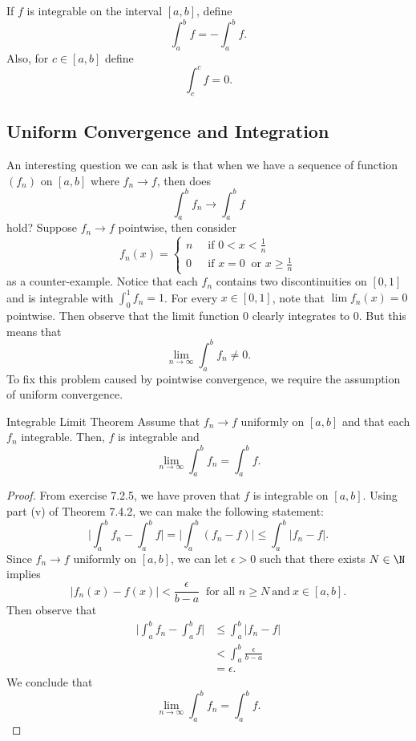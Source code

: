 \begin{definition}{}{}
	If \( f  \) is integrable on the interval \( [a,b]  \), define 
	\[  \int_{ a }^{ b } f = - \int_{ a }^{b  } f. \]
	Also, for \( c \in [a,b]  \) define 
	\[  \int_{ c }^{ c } f = 0. \]
\end{definition}

\subsection{Uniform Convergence and Integration}

An interesting question we can ask is that when we have a sequence of function \( (f_{n}) \) on \( [a,b]  \) where \( f_{n} \to f  \), then does 
\[  \int_{ a }^{ b } f_{n} \to \int_{ a }^{ b } f  \]
hold? Suppose \( f_{n} \to f  \) pointwise, then consider 
\[  f_{n}(x) = 
\begin{cases}
	n \ &\text{ if } 0 < x < \frac{ 1 }{ n } \\
	0 \ &\text{ if } x = 0 \ \text{ or } x \geq \frac{ 1 }{ n }
\end{cases} \]
as a counter-example. Notice that each \( f_{n} \) contains two discontinuities on \( [0,1] \) and is integrable with \( \int_{ 0 }^{ 1 } f_{n} = 1  \). For every \( x \in [0,1] \), note that \( \lim f_{n}(x) = 0  \) pointwise.  Then observe that the limit function \( 0  \) clearly integrates to \( 0 \). But this means that 
\[  \lim_{ n \to \infty  }  \int_{ a }^{ b } f_{n} \neq 0. \]
To fix this problem caused by pointwise convergence, we require the assumption of uniform convergence. 


\begin{theorem}{Integrable Limit Theorem}{}
	Assume that \( f_{n} \to f  \) uniformly on \( [a,b]  \) and that each \( f_{n}  \) integrable. Then, \( f \) is integrable and 
	\[  \lim_{ n \to \infty  }  \int_{ a }^{ b } f_{n} = \int_{ a }^{ b } f. \]
	\end{theorem}
\begin{proof} From exercise 7.2.5, we have proven that \( f  \) is integrable on \( [a,b] \). 
	Using part (v) of Theorem 7.4.2, we can make the following statement:
	\[ \Big| \int_{ a }^{ b } f_{n} - \int_{ a }^{ b } f  \Big| = \Big| \int_{ a }^{ b }  (f_{n} - f )  \Big| \leq \int_{ a }^{ b }  | f_{n} -f  |.   \]
	Since \( f_{n} \to f  \) uniformly on \( [a,b] \), we can let \( \epsilon > 0  \) such that there exists \( N \in \N \) implies 
	\[  | f_{n}(x) - f(x)  | < \frac{ \epsilon  }{ b -a  }  \ \text{ for all } n \geq N \ \text{and} \ x \in [a,b].\] Then observe that 
	\begin{align*}
	    \Big| \int_{ a }^{ b } f_{n} - \int_{ a }^{ b } f  \Big| &\leq \int_{ a }^{ b } | f_{n} - f  |   \\
																 &< \int_{ a }^{ b }  \frac{ \epsilon  }{ b -a  } \\
																 &= \epsilon.
	\end{align*}
	We conclude that 
	\[  \lim_{ n \to \infty  }  \int_{ a }^{ b } f_{n} = \int_{ a }^{ b } f. \]
\end{proof}


